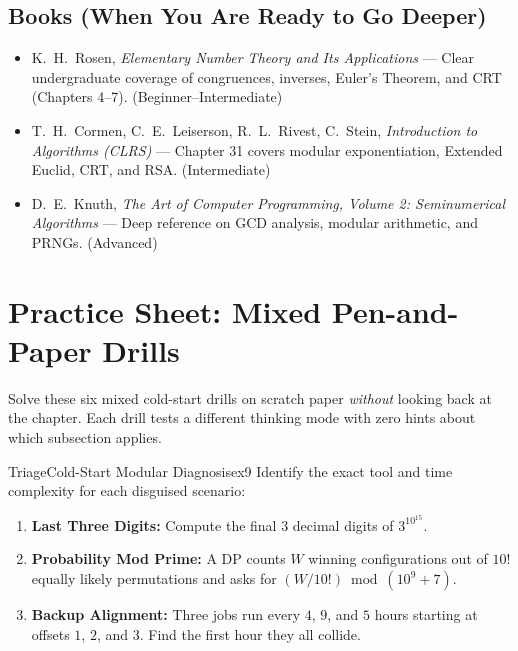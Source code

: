 \documentclass[11pt,a4paper]{article}
\theoremstyle{definition}
\begin{document}
\subsection*{Books (When You Are Ready to Go Deeper)}
\begin{itemize}
    \item K.\ H.\ Rosen, \emph{Elementary Number Theory and Its Applications} --- Clear undergraduate coverage of congruences, inverses, Euler's Theorem, and CRT (Chapters 4--7). (Beginner--Intermediate)
    \item T.\ H.\ Cormen, C.\ E.\ Leiserson, R.\ L.\ Rivest, C.\ Stein, \emph{Introduction to Algorithms (CLRS)} --- Chapter 31 covers modular exponentiation, Extended Euclid, CRT, and RSA. (Intermediate)
    \item D.\ E.\ Knuth, \emph{The Art of Computer Programming, Volume 2: Seminumerical Algorithms} --- Deep reference on GCD analysis, modular arithmetic, and PRNGs. (Advanced)
\end{itemize}

\section*{Practice Sheet: Mixed Pen-and-Paper Drills}

\noindent
Solve these six mixed cold-start drills on scratch paper \emph{without} looking back at the chapter. Each drill tests a different thinking mode with zero hints about which subsection applies.

\begin{tryitbox}{Triage}{Cold-Start Modular Diagnosis}{ex9}
Identify the exact tool and time complexity for each disguised scenario:
\begin{enumerate}
    \item \textbf{Last Three Digits:} Compute the final $3$ decimal digits of $3^{10^{15}}$.
    \item \textbf{Probability Mod Prime:} A DP counts $W$ winning configurations out of $10!$ equally likely permutations and asks for $(W / 10!) \bmod (10^9 + 7)$.
    \item \textbf{Backup Alignment:} Three jobs run every $4$, $9$, and $5$ hours starting at offsets $1$, $2$, and $3$. Find the first hour they all collide.
\end{enumerate}
\end{tryitbox}
\end{document}
